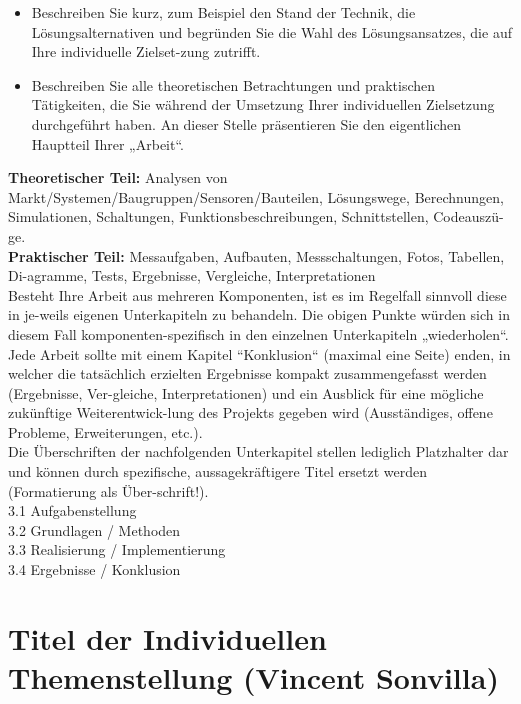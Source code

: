 \documentclass{article}
\begin{document}
\begin{itemize}
    \item Beschreiben Sie kurz, zum Beispiel den Stand der Technik, die Lösungsalternativen und begründen Sie die Wahl des Lösungsansatzes, die auf Ihre individuelle Zielset-zung zutrifft. 
    \item Beschreiben Sie alle theoretischen Betrachtungen und praktischen Tätigkeiten, die Sie während der Umsetzung Ihrer individuellen Zielsetzung durchgeführt haben. An dieser Stelle präsentieren Sie den eigentlichen Hauptteil Ihrer „Arbeit“.
\end{itemize}

\textbf{Theoretischer Teil:} Analysen von Markt/Systemen/Baugruppen/Sensoren/Bauteilen, Lösungswege, Berechnungen, Simulationen, Schaltungen, Funktionsbeschreibungen, Schnittstellen, Codeauszü-ge. \\
\textbf{Praktischer Teil:} Messaufgaben, Aufbauten, Messschaltungen, Fotos, Tabellen, Di-agramme, Tests, Ergebnisse, Vergleiche, Interpretationen\\
Besteht Ihre Arbeit aus mehreren Komponenten, ist es im Regelfall sinnvoll diese in je-weils eigenen Unterkapiteln zu behandeln. Die obigen Punkte würden sich in diesem Fall komponenten-spezifisch in den einzelnen Unterkapiteln „wiederholen“. \\
Jede Arbeit sollte mit einem Kapitel “Konklusion“ (maximal eine Seite) enden, in welcher die tatsächlich erzielten Ergebnisse kompakt zusammengefasst werden (Ergebnisse, Ver-gleiche, Interpretationen) und ein Ausblick für eine mögliche zukünftige Weiterentwick-lung des Projekts gegeben wird (Ausständiges, offene Probleme, Erweiterungen, etc.).\\
Die Überschriften der nachfolgenden Unterkapitel stellen lediglich Platzhalter dar und können durch spezifische, aussagekräftigere Titel ersetzt werden (Formatierung als Über-schrift!).\\
3.1 Aufgabenstellung\\
3.2 Grundlagen / Methoden\\
3.3 Realisierung / Implementierung\\
3.4 Ergebnisse / Konklusion\\

\color{black}
\newpage
\section{Titel der Individuellen Themenstellung (Vincent Sonvilla)}
\end{document}
